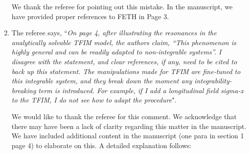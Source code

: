 \documentclass[aps,prb,reprint,showpacs,floatfix,superscriptaddress, onecolumn, nofootinbib, 9pt]{revtex4-2}
\newcommand{\response}[1]{{\color{black}#1}} %
\newcommand{\comment}[1]{{\color{blue}#1}} %
\begin{document}
\begin{enumerate}
		\response{
			We thank the referee for pointing out this mistake. In the manuscript, we have provided proper references to FETH in Page 3.
		}
		
		\item The referee says, \comment{``\textit{On page 4, after illustrating the resonances in the analytically solvable TFIM model, the authors claim, “This phenomenon is highly general and can be readily adapted to non-integrable systems”. I disagree with the statement, and clear references, if any, need to be cited to back up this statement. The manipulations made for TFIM are fine-tuned to this integrable system, and they break down the moment any integrability-breaking term is introduced. For example, if I add a longitudinal field sigma-x to the TFIM, I do not see how to adapt the procedure}"}.\\

		\response{ We would like to thank the referee for this comment. We acknowledge that there may have been a lack of clarity regarding this matter in the manuscript. We have included additional content in the manuscript (one para in section 1 page 4) to elaborate on this. A detailed explanation follows:
			
}
\end{enumerate}
\end{document}
